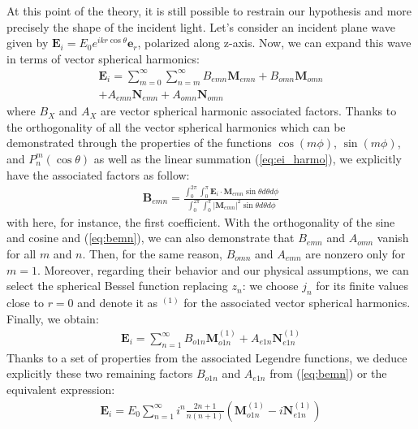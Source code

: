 \documentclass{article}
\numberwithin{equation}{section}
\begin{document}
At this point of the theory, it is still possible to restrain our hypothesis and more precisely the shape of the incident light. Let's consider an incident plane wave given by $\textbf{E}_{i}=E_{0}e^{ikr\cos\theta}\textbf{e}_{r}$, polarized along z-axis. Now, we can expand this wave in terms of vector spherical harmonics:
\begin{equation}\label{eq:ei_harmo}
\begin{aligned}
\textbf{E}_{i}=\sum_{m=0}^{\infty }\sum_{n=m}^{\infty }B_{emn}\textbf{M}_{emn}+B_{omn}\textbf{M}_{omn}\\
+A_{emn}\textbf{N}_{emn}+A_{omn}\textbf{N}_{omn}
\end{aligned}
\end{equation}
where $B_{X}$ and $A_{X}$ are vector spherical harmonic associated factors. Thanks to the orthogonality of all the vector spherical harmonics which can be demonstrated through the properties of the functions $\cos(m\phi)$, $\sin(m\phi)$, and $P_{n}^{m}(\cos\theta)$ as well as the linear summation (\ref{eq:ei_harmo}), we explicitly have the associated factors as follow:
\begin{align}\label{eq:bemn}
\textbf{B}_{emn}=\frac{\int_{0}^{2\pi}\int_{0}^{\pi}\textbf{E}_{i}\cdot \textbf{M}_{emn}\sin\theta d\theta d\phi}{\int_{0}^{2\pi}\int_{0}^{\pi}|\textbf{M}_{emn}|^{2}\sin\theta d\theta d\phi}
\end{align}
with here, for instance, the first coefficient. With the orthogonality of the sine and cosine and (\ref{eq:bemn}), we can also demonstrate that $B_{emn}$ and $A_{omn}$ vanish for all $m$ and $n$. Then, for the same reason, $B_{omn}$ and $A_{emn}$ are nonzero only for $m=1$. Moreover, regarding their behavior and our physical assumptions, we can select the spherical Bessel function replacing $z_{n}$: we choose $j_{n}$ for its finite values close to $r=0$ and denote it as $^{(1)}$ for the associated vector spherical harmonics. Finally, we obtain:
\begin{align}
\textbf{E}_{i}=\sum_{n=1}^{\infty }B_{o1n}\textbf{M}^{(1)}_{o1n} + A_{e1n}\textbf{N}^{(1)}_{e1n}
\end{align}
Thanks to a set of properties from the associated Legendre functions, we deduce explicitly these two remaining factors $B_{o1n}$ and $A_{e1n}$ from (\ref{eq:bemn}) or the equivalent expression:
\begin{align}
\textbf{E}_{i}=E_{0}\sum_{n=1}^{\infty }i^{n}\frac{2n+1}{n(n+1)}(\textbf{M}^{(1)}_{o1n} - i\textbf{N}^{(1)}_{e1n})
\end{align}
\end{document}
